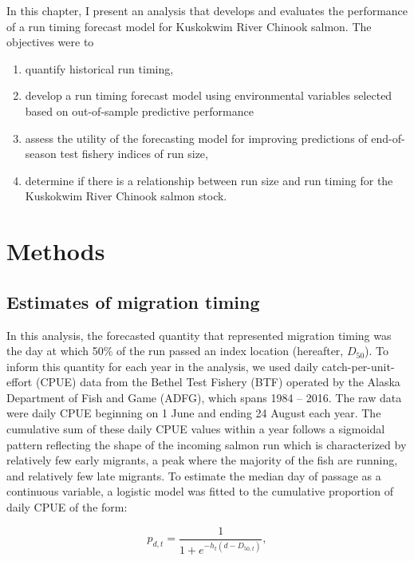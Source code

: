 \documentclass[12pt,]{book}
\providecommand{\tightlist}{%
  \setlength{\itemsep}{0pt}\setlength{\parskip}{0pt}}
\theoremstyle{definition}
\theoremstyle{definition}
\theoremstyle{definition}
\theoremstyle{remark}
\begin{document}
In this chapter, I present an analysis that develops and evaluates the
performance of a run timing forecast model for Kuskokwim River Chinook
salmon. The objectives were to

\begin{enumerate}
\def\labelenumi{\arabic{enumi}.}
\tightlist
\item
  quantify historical run timing,
\item
  develop a run timing forecast model using environmental variables
  selected based on out-of-sample predictive performance
\item
  assess the utility of the forecasting model for improving predictions
  of end-of-season test fishery indices of run size,
\item
  determine if there is a relationship between run size and run timing
  for the Kuskokwim River Chinook salmon stock.
\end{enumerate}

\section{Methods}\label{methods}

\subsection{Estimates of migration
timing}\label{estimates-of-migration-timing}

\noindent
In this analysis, the forecasted quantity that represented migration
timing was the day at which 50\% of the run passed an index location
(hereafter, \(D_{50}\)). To inform this quantity for each year in the
analysis, we used daily catch-per-unit-effort (CPUE) data from the
Bethel Test Fishery (BTF) operated by the Alaska Department of Fish and
Game (ADFG), which spans 1984 -- 2016. The raw data were daily CPUE
beginning on 1 June and ending 24 August each year. The cumulative sum
of these daily CPUE values within a year follows a sigmoidal pattern
reflecting the shape of the incoming salmon run which is characterized
by relatively few early migrants, a peak where the majority of the fish
are running, and relatively few late migrants. To estimate the median
day of passage as a continuous variable, a logistic model was fitted to
the cumulative proportion of daily CPUE of the form:

\begin{equation}
  p_{d,t}=\frac{1}{1 + e^{-h_t (d - D_{50,t})}},
  \label{eq:logistic}
\end{equation}
\end{document}

